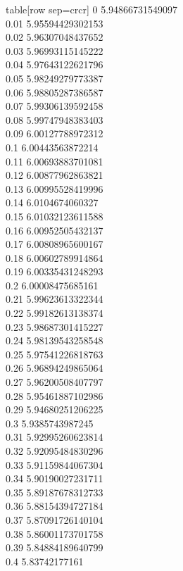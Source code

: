   table[row sep=crcr]{%
0	5.94866731549097\\
0.01	5.95594429302153\\
0.02	5.96307048437652\\
0.03	5.96993115145222\\
0.04	5.97643122621796\\
0.05	5.98249279773387\\
0.06	5.98805287386587\\
0.07	5.99306139592458\\
0.08	5.99747948383403\\
0.09	6.00127788972312\\
0.1	6.00443563872214\\
0.11	6.00693883701081\\
0.12	6.00877962863821\\
0.13	6.00995528419996\\
0.14	6.0104674060327\\
0.15	6.01032123611588\\
0.16	6.00952505432137\\
0.17	6.00808965600167\\
0.18	6.00602789914864\\
0.19	6.00335431248293\\
0.2	6.00008475685161\\
0.21	5.99623613322344\\
0.22	5.99182613138374\\
0.23	5.98687301415227\\
0.24	5.98139543258548\\
0.25	5.97541226818763\\
0.26	5.96894249865064\\
0.27	5.96200508407797\\
0.28	5.95461887102986\\
0.29	5.94680251206225\\
0.3	5.9385743987245\\
0.31	5.92995260623814\\
0.32	5.92095484830296\\
0.33	5.91159844067304\\
0.34	5.90190027231711\\
0.35	5.89187678312733\\
0.36	5.88154394727184\\
0.37	5.87091726140104\\
0.38	5.86001173701758\\
0.39	5.84884189640799\\
0.4	5.83742177161\\
}
